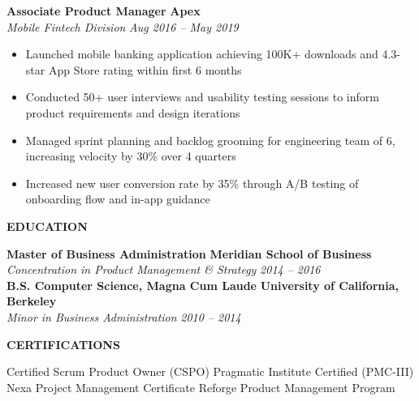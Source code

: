 \documentclass[11pt,letterpaper]{article}
\newcommand{\cvsection}[1]{%
  \begin{sectionbox}
    {\Large\bfseries\color{primary}\MakeUppercase{#1}}
  \end{sectionbox}
}
\begin{document}
\vspace{2pt}
\noindent
\textbf{Associate Product Manager} \hfill \textbf{Apex}\\[1pt]
\textit{Mobile Fintech Division} \hfill \textit{Aug 2016 -- May 2019}\\[5pt]
\begin{itemize}
  \item Launched mobile banking application achieving 100K+ downloads and 4.3-star App Store rating within first 6 months
  \item Conducted 50+ user interviews and usability testing sessions to inform product requirements and design iterations
  \item Managed sprint planning and backlog grooming for engineering team of 6, increasing velocity by 30\% over 4 quarters
  \item Increased new user conversion rate by 35\% through A/B testing of onboarding flow and in-app guidance
\end{itemize}

\cvsection{Education}

\noindent
\textbf{Master of Business Administration} \hfill \textbf{Meridian School of Business}\\[1pt]
\textit{Concentration in Product Management \& Strategy} \hfill \textit{2014 -- 2016}\\[6pt]

\noindent
\textbf{B.S. Computer Science, Magna Cum Laude} \hfill \textbf{University of California, Berkeley}\\[1pt]
\textit{Minor in Business Administration} \hfill \textit{2010 -- 2014}

\cvsection{Certifications}

\noindent Certified Scrum Product Owner (CSPO) \textbar{} Pragmatic Institute Certified (PMC-III) \textbar{} Nexa Project Management Certificate \textbar{} Reforge Product Management Program
\end{document}
